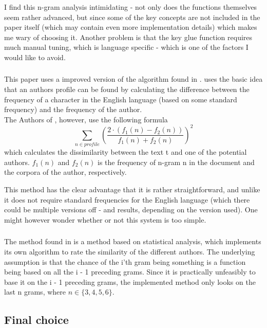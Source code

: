 I find this n-gram analysis intimidating - not only does the functions themselves seem rather advanced, but since some of the key concepts are not included in the paper itself (which may contain even more implementation details) which makes me wary of choosing it. Another problem is that the key glue function requires much manual tuning, which is language specific - which is one of the factors I would like to avoid. 

\subsubsection{\cite{nr2}}
This paper uses a improved version of the algorithm found in \cite{Bennet}. \cite{Bennet} uses the basic idea that an authors profile can be found by calculating the difference between the frequency of a character in the English language (based on some standard frequency) and the frequency of the author.\\

The Authors of \cite{nr2}, however, use the following formula
$$
\sum_{n \in profile}\left(\frac{2 \cdot (f_1(n) - f_2(n))}{f_1(n) + f_2(n)}\right)^2
$$
which calculates the dissimilarity between the text t and one of the potential authors. $f_1(n)$ and $f_2(n)$ is the frequency of n-gram n in the document and the corpora of the author, respectively. 

This method has the clear advantage that it is rather straightforward, and unlike \cite{Bennet} it does not require standard frequencies for the English language (which there could be multiple versions off - and results, depending on the version used). One might however wonder whether or not this system is too simple.

\subsubsection{\cite{nr4}}
The method found in \cite{nr4} is a method based on statistical analysis, which implements its own algorithm to rate the similarity of the different authors. The underlying assumption is that the chance of the i'th gram being something is a function being based on all the i - 1 preceding grams. Since it is practically unfeasibly to base it on the i - 1 preceding grams, the implemented method only looks on the last n grams, where $n \in \{3,4,5,6 \}$. 

\subsection{Final choice}

